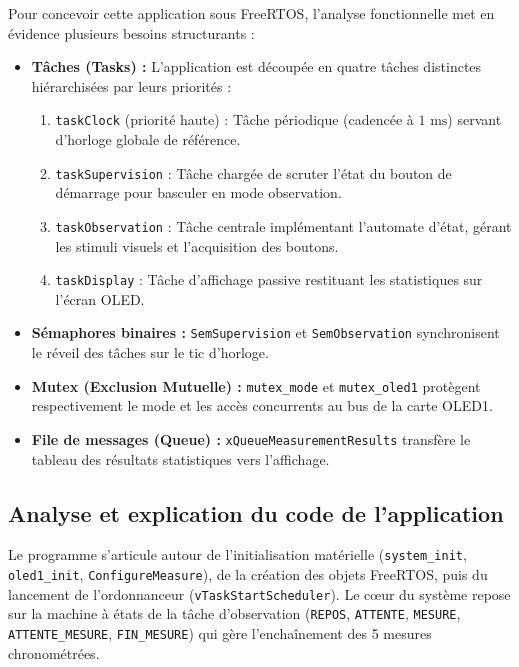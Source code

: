 Pour concevoir cette application sous FreeRTOS, l'analyse fonctionnelle met en évidence plusieurs besoins structurants :
\begin{itemize}
    \item \textbf{Tâches (Tasks) :} L'application est découpée en quatre tâches distinctes hiérarchisées par leurs priorités :
    \begin{enumerate}
        \item \texttt{taskClock} (priorité haute) : Tâche périodique (cadencée à $1\text{ ms}$) servant d'horloge globale de référence.
        \item \texttt{taskSupervision} : Tâche chargée de scruter l'état du bouton de démarrage pour basculer en mode observation.
        \item \texttt{taskObservation} : Tâche centrale implémentant l'automate d'état, gérant les stimuli visuels et l'acquisition des boutons.
        \item \texttt{taskDisplay} : Tâche d'affichage passive restituant les statistiques sur l'écran OLED.
    \end{enumerate}
    \item \textbf{Sémaphores binaires :} \texttt{SemSupervision} et \texttt{SemObservation} synchronisent le réveil des tâches sur le tic d'horloge.
    \item \textbf{Mutex (Exclusion Mutuelle) :} \texttt{mutex\_mode} et \texttt{mutex\_oled1} protègent respectivement le mode et les accès concurrents au bus de la carte OLED1.
    \item \textbf{File de messages (Queue) :} \texttt{xQueueMeasurementResults} transfère le tableau des résultats statistiques vers l'affichage.
\end{itemize}

\subsection{Analyse et explication du code de l'application}

Le programme s'articule autour de l'initialisation matérielle (\texttt{system\_init}, \texttt{oled1\_init}, \texttt{ConfigureMeasure}), de la création des objets FreeRTOS, puis du lancement de l'ordonnanceur (\texttt{vTaskStartScheduler}). Le cœur du système repose sur la machine à états de la tâche d'observation (\texttt{REPOS}, \texttt{ATTENTE}, \texttt{MESURE}, \texttt{ATTENTE\_MESURE}, \texttt{FIN\_MESURE}) qui gère l'enchaînement des 5 mesures chronométrées. \\

